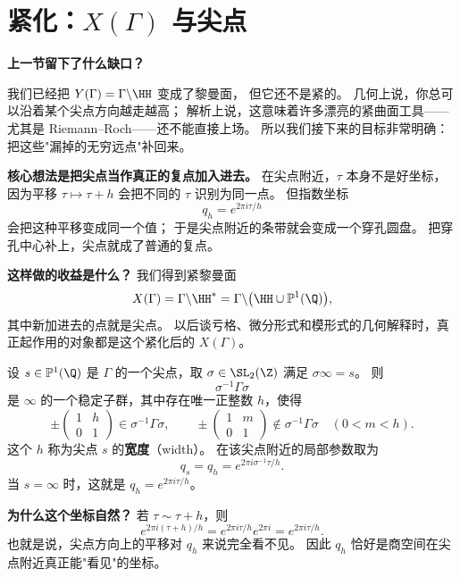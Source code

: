 \section{紧化：$X(\Gamma)$ 与尖点}
\label{sec:compactification}
\label{sec:compactification-X}

\textbf{上一节留下了什么缺口？}

我们已经把 $Y(\Gamma)=\Gamma\backslash\HH$ 变成了黎曼面，
但它还不是紧的。
几何上说，你总可以沿着某个尖点方向越走越高；
解析上说，这意味着许多漂亮的紧曲面工具——尤其是 Riemann--Roch——还不能直接上场。
所以我们接下来的目标非常明确：把这些"漏掉的无穷远点"补回来。

\textbf{核心想法是把尖点当作真正的复点加入进去。}
在尖点附近，$\tau$ 本身不是好坐标，
因为平移 $\tau\mapsto\tau+h$ 会把不同的 $\tau$ 识别为同一点。
但指数坐标
\[
  q_h=e^{2\pi i\tau/h}
\]
会把这种平移变成同一个值；
于是尖点附近的条带就会变成一个穿孔圆盘。
把穿孔中心补上，尖点就成了普通的复点。

\textbf{这样做的收益是什么？}
我们得到紧黎曼面
\[
  X(\Gamma)=\Gamma\backslash\HH^*=\Gamma\backslash\bigl(\HH\cup\mathbb{P}^1(\Q)\bigr),
\]
其中新加进去的点就是尖点。
以后谈亏格、微分形式和模形式的几何解释时，真正起作用的对象都是这个紧化后的 $X(\Gamma)$。

\begin{definition}[尖点宽度与局部参数]
\label{def:cusp-width}
设 $s\in\mathbb{P}^1(\Q)$ 是 $\Gamma$ 的一个尖点，取
$\sigma\in\SL_2(\Z)$ 满足 $\sigma\infty=s$。
则
\[
  \sigma^{-1}\Gamma\sigma
\]
是 $\infty$ 的一个稳定子群，其中存在唯一正整数 $h$，使得
\[
  \pm\begin{pmatrix}1&h\\0&1\end{pmatrix}\in \sigma^{-1}\Gamma\sigma,
  \qquad
  \pm\begin{pmatrix}1&m\\0&1\end{pmatrix}\notin \sigma^{-1}\Gamma\sigma
  \quad (0<m<h).
\]
这个 $h$ 称为尖点 $s$ 的\textbf{宽度}（width）。
在该尖点附近的局部参数取为
\[
  q_s=q_h=e^{2\pi i\sigma^{-1}\tau/h}.
\]
当 $s=\infty$ 时，这就是 $q_h=e^{2\pi i\tau/h}$。
\end{definition}

\textbf{为什么这个坐标自然？}
若 $\tau\sim \tau+h$，则
\[
  e^{2\pi i(\tau+h)/h}=e^{2\pi i\tau/h}e^{2\pi i}=e^{2\pi i\tau/h}.
\]
也就是说，尖点方向上的平移对 $q_h$ 来说完全看不见。
因此 $q_h$ 恰好是商空间在尖点附近真正能"看见"的坐标。

